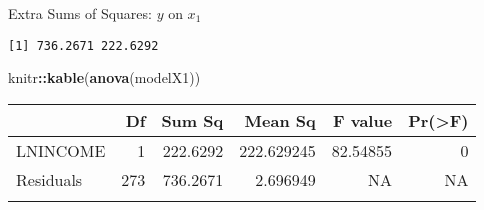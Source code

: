 \documentclass[
  ignorenonframetext,
]{beamer}
\newenvironment{Shaded}{\begin{snugshade}}{\end{snugshade}}
\newcommand{\DecValTok}[1]{\textcolor[rgb]{0.00,0.00,0.81}{#1}}
\newcommand{\FunctionTok}[1]{\textcolor[rgb]{0.13,0.29,0.53}{\textbf{#1}}}
\newcommand{\NormalTok}[1]{#1}
\newcommand{\OtherTok}[1]{\textcolor[rgb]{0.56,0.35,0.01}{#1}}
\newcommand{\SpecialCharTok}[1]{\textcolor[rgb]{0.81,0.36,0.00}{\textbf{#1}}}
\begin{document}
\begin{frame}[fragile]{Extra Sums of Squares: \(y\) on \(x_1\)}
\protect\hypertarget{extra-sums-of-squares-y-on-x_1-1}{}
\normalsize

\begin{Shaded}
\end{Shaded}

\begin{verbatim}
[1] 736.2671 222.6292
\end{verbatim}

\begin{Shaded}
\begin{Highlighting}[]
\NormalTok{knitr}\SpecialCharTok{::}\FunctionTok{kable}\NormalTok{(}\FunctionTok{anova}\NormalTok{(modelX1))}
\end{Highlighting}
\end{Shaded}

\begin{longtable}[]{@{}lrrrrr@{}}
\toprule\noalign{}
& Df & Sum Sq & Mean Sq & F value & Pr(\textgreater F) \\
\midrule\noalign{}
\endhead
LNINCOME & 1 & 222.6292 & 222.629245 & 82.54855 & 0 \\
Residuals & 273 & 736.2671 & 2.696949 & NA & NA \\
\bottomrule\noalign{}
\end{longtable}

\normalsize
\end{frame}
\end{document}
